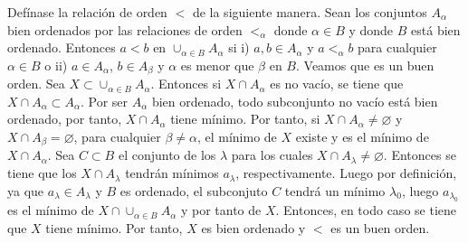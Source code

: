\documentclass{article}
\begin{document}
Defínase la relación de orden $<$ de la siguiente manera. Sean los conjuntos $A_{\alpha}$ bien ordenados por las relaciones de orden $<_{\alpha}$ donde $\alpha \in B$ y donde $B$ está bien ordenado. Entonces $a<b$ en $\cup_{\alpha \in B}A_{\alpha}$ si i) $a,b\in A_{\alpha}$ y $a<_{\alpha}b$ para cualquier $\alpha \in B$ o ii) $a\in A_{\alpha}$, $b\in A_{\beta}$ y $\alpha$ es menor que $\beta$ en $B$. Veamos que es un buen orden. Sea $X\subset \cup_{\alpha \in B}A_{\alpha}$. Entonces si $X\cap A_{\alpha}$ es no vacío, se tiene que $X\cap A_{\alpha}\subset A_{\alpha}$. Por ser $A_{\alpha}$ bien ordenado, todo subconjunto no vacío está bien ordenado, por tanto, $X\cap A_{\alpha}$ tiene mínimo. Por tanto, si $X\cap A_{\alpha}\neq \varnothing$ y $X\cap A_{\beta} = \varnothing$, para cualquier $\beta\neq \alpha$, el mínimo de $X$ existe y es el mínimo de $X\cap A_{\alpha}$. Sea $C\subset B$ el conjunto de los $\lambda$ para los cuales $X\cap A_{\lambda}\neq \varnothing$. Entonces se tiene que los $X\cap A_\lambda$ tendrán mínimos $a_{\lambda}$, respectivamente. Luego por definición, ya que $a_{\lambda}\in A_{\lambda}$ y $B$ es ordenado, el subconjuto  $C$ tendrá un mínimo $\lambda_{0}$, luego $a_{\lambda_0}$ es el mínimo de $X\cap \cup_{\alpha \in B}A_{\alpha}$ y por tanto de $X$. Entonces, en todo caso se tiene que $X$ tiene mínimo. Por tanto, $X$ es bien ordenado y $<$ es un buen orden.
\end{document}
